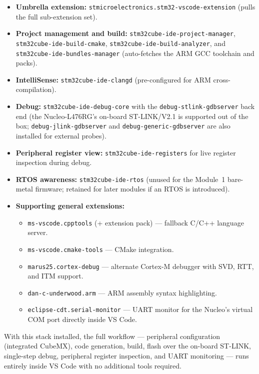 \documentclass[11pt,letterpaper]{article}
\begin{document}
	\begin{itemize}[leftmargin=2em]
		\item \textbf{Umbrella extension:} \texttt{stmicroelectronics.stm32-vscode-extension} (pulls the full sub-extension set).
		\item \textbf{Project management and build:} \texttt{stm32cube-ide-project-manager}, \texttt{stm32cube-ide-build-cmake}, \texttt{stm32cube-ide-build-analyzer}, and \texttt{stm32cube-ide-bundles-manager} (auto-fetches the ARM GCC toolchain and \HAL{} packs).
		\item \textbf{IntelliSense:} \texttt{stm32cube-ide-clangd} (pre-configured for ARM cross-compilation).
		\item \textbf{Debug:} \texttt{stm32cube-ide-debug-core} with the \texttt{debug-stlink-gdbserver} back end (the Nucleo-L476RG's on-board ST-LINK/V2.1 is supported out of the box; \texttt{debug-jlink-gdbserver} and \texttt{debug-generic-gdbserver} are also installed for external probes).
		\item \textbf{Peripheral register view:} \texttt{stm32cube-ide-registers} for live register inspection during debug.
		\item \textbf{RTOS awareness:} \texttt{stm32cube-ide-rtos} (unused for the Module~1 bare-metal firmware; retained for later modules if an \mbox{RTOS} is introduced).
		\newpage
		\item \textbf{Supporting general extensions:}
		\begin{itemize}[leftmargin=1.5em, topsep=2pt, itemsep=1pt]
			\item \texttt{ms-vscode.cpptools} (+ extension pack) --- fallback C/C++ language server.
			\item \texttt{ms-vscode.cmake-tools} --- CMake integration.
			\item \texttt{marus25.cortex-debug} --- alternate Cortex-M debugger with SVD, RTT, and ITM support.
			\item \texttt{dan-c-underwood.arm} --- ARM assembly syntax highlighting.
			\item \texttt{eclipse-cdt.serial-monitor} --- UART monitor for the Nucleo's virtual COM port directly inside VS Code.
		\end{itemize}
	\end{itemize}

	With this stack installed, the full workflow --- peripheral configuration (integrated CubeMX), code generation, build, flash over the on-board ST-LINK, single-step debug, peripheral register inspection, and UART monitoring --- runs entirely inside VS Code with no additional tools required.
\end{document}
